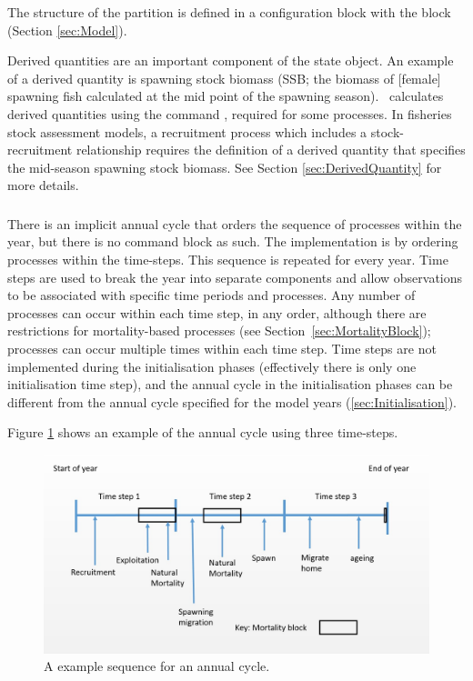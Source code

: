 The structure of the partition is defined in a configuration block with the  block (Section \ref{sec:Model}).

Derived quantities are an important component of the state object. An example of a derived quantity is spawning stock biomass (SSB; the biomass of [female] spawning fish calculated at the mid point of the spawning season). \CNAME\ calculates derived quantities using the command , required for some processes. In fisheries stock assessment models, a recruitment process which includes a stock-recruitment relationship requires the definition of a derived quantity that specifies the mid-season spawning stock biomass. See Section \ref{sec:DerivedQuantity} for more details.

\subsubsection{}\label{sec:TimeStep}

There is an implicit annual cycle that orders the sequence of processes within the year, but there is no command block as such. The implementation is by ordering processes within the time-steps. This sequence is repeated for every year. Time steps are used to break the year into separate components and allow observations to be associated with specific time periods and processes. Any number of processes can occur within each time step, in any order, although there are restrictions for mortality-based processes (see Section~\ref{sec:MortalityBlock}); processes can occur multiple times within each time step. Time steps are not implemented during the initialisation phases (effectively there is only one initialisation time step), and the annual cycle in the initialisation phases can be different from the annual cycle specified for the model years (\ref{sec:Initialisation}).

Figure \ref{Fig:annual} shows an example of the annual cycle using three time-steps.

\begin{figure}[H]
	\centering
	\includegraphics[scale=0.5]{Figures/annual_cycle.jpg}
	\caption{A example sequence for an annual cycle.}\label{Fig:annual}
\end{figure}

